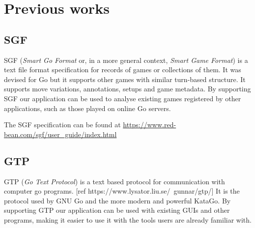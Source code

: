 \section{Previous works}

\subsection{SGF}

SGF (\textit{Smart Go Format} or, in a more general context, \textit{Smart Game
Format}) is a text file format specification for records of games or collections
of them. It was devised for Go but it supports other games with similar
turn-based structure. It supports move variations, annotations, setups and game
metadata. By supporting SGF our application can be used to analyse existing
games registered by other applications, such as those played on online Go
servers.

The SGF specification can be found at
\url{https://www.red-bean.com/sgf/user_guide/index.html}

\subsection{GTP}

GTP (\textit{Go Text Protocol}) is a text based protocol for communication with
computer go programs. [ref https://www.lysator.liu.se/~gunnar/gtp/] It is the
protocol used by GNU Go and the more modern and powerful KataGo. By supporting
GTP our application can be used with existing GUIs and other programs, making
it easier to use it with the tools users are already familiar with.
